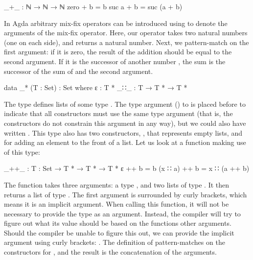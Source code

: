 		\begin{code}
			_+_ : ℕ → ℕ → ℕ
			zero   + b = b
			suc a  + b = suc (a + b)
		\end{code}

		In Agda arbitrary mix-fix operators can be introduced using \codett{\_}
		to denote the arguments of the mix-fix operator. Here, our operator
		\codett{\_+\_} takes two natural numbers (one on each side), and
		returns a natural number. Next, we pattern-match on the first argument:
		if it is zero, the result of the addition should be equal to the second
		argument. If it is the successor of another number , the sum
		is the successor of the sum of  and the second argument.

		\begin{code}
			data _* (T : Set) : Set where
			  ε    : T *
			  _∷_  : T → T * → T *
		\end{code}

		The type \codett{\_*} defines lists of some type . The type
		argument () to \codett{\_*} is placed before \codett{:}
		to indicate that all constructors must use the same type argument (that
		is, the constructors do not constrain this argument in any way), but we
		could also have written . This type
		also has two constructors, , that represents empty lists, and
		 for adding an element to the front of a list. Let us
		look at a function making use of this type:

		\begin{code}
			_++_ : {T : Set} → T * → T * → T *
			ε        ++ b = b
			(x ∷ a)  ++ b = x ∷ (a ++ b)
		\end{code}

		The function \codett{\_++\_} takes three arguments: a type ,
		and two lists of type . It then returns a list of type
		. The first argument is surrounded by curly brackets, which
		means it is an implicit argument. When calling this function, it will
		not be necessary to provide the type as an argument. Instead, the
		compiler will try to figure out what its value should be based on the
		functions other arguments. Should the compiler be unable to figure this
		out, we can provide the implicit argument using curly brackets:
		. The definition of \codett{\_++\_}
		pattern-matches on the constructors for , and the result is
		the concatenation of the arguments.

